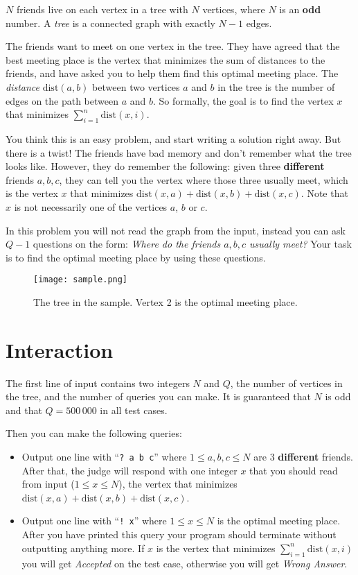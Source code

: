 
$N$ friends live on each vertex in a tree with $N$ vertices, where $N$ is an \textbf{odd} number.
A \emph{tree} is a connected graph with exactly $N-1$ edges.

The friends want to meet on one vertex in the tree.
They have agreed that the best meeting place is the vertex that minimizes
the sum of distances to the friends, and have asked you to help them find 
this optimal meeting place.
The \emph{distance} $\text{dist}(a,b)$ between two vertices $a$ and $b$ in the tree is 
the number of edges on the path between $a$ and $b$.
So formally, the goal is to find the vertex $x$ that minimizes 
$\sum_{i=1}^{n} \text{dist}(x,i)$.

You think this is an easy problem, and start writing a solution right away.
But there is a twist!
The friends have bad memory and don't remember what the tree looks like.
However, they do remember the following: given three \textbf{different} friends 
$a,b,c$, they can tell you the vertex where those three usually meet, which is
the vertex $x$ that minimizes
$\text{dist}(x,a) +\text{dist}(x,b) +\text{dist}(x,c)$.
Note that $x$ is not necessarily one of the vertices $a$, $b$ or $c$.

In this problem you will not read the graph from the input, instead you can ask $Q-1$
questions on the form:
\emph{Where do the friends $a,b,c$ usually meet?}
Your task is to find the optimal meeting place by using these questions.

\begin{figure}[!h]
\begin{center}
  \texttt{[image: sample.png]}
\end{center}
  \caption{The tree in the sample. Vertex 2 is the optimal meeting place.}
\end{figure}

\section*{Interaction}

The first line of input contains two integers $N$ and $Q$,
the number of vertices in the tree, and the number of queries you can make.
It is guaranteed that $N$ is odd and that $Q = 500\,000$ in all test cases.

Then you can make the following queries:
\begin{itemize}
  \item Output one line with ``\verb|? a b c|'' where $1\le a,b,c\le N$ are $3$ \textbf{different} friends.
    After that, the judge will respond with one integer $x$ that you should read from input
    ($1\le x\le N$), the vertex that minimizes $\text{dist}(x,a) +\text{dist}(x,b) +\text{dist}(x,c)$.
  \item Output one line with ``\verb|! x|'' where $1\le x\le N$ is the optimal meeting place.
    After you have printed this query your program should terminate without outputting anything more. 
    If $x$ is the vertex that minimizes $\sum_{i=1}^{n} \text{dist}(x,i)$ you will get \textit{Accepted} on the test case, otherwise you will get \textit{Wrong Answer}.
\end{itemize}

